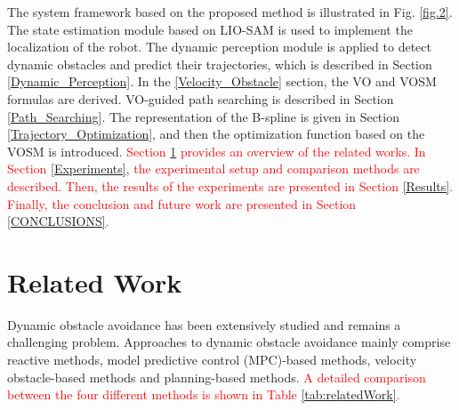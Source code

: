 \documentclass[preprint,5p,times,twocolumn,authoryear]{elsarticle}
\begin{document}
The system framework based on the proposed method is illustrated in Fig. \ref{fig.2}. The state estimation module based on LIO-SAM \citep{shan2020lio} is used to implement the localization of the robot. The dynamic perception module is applied to detect dynamic obstacles and predict their trajectories, which is described in Section \ref{Dynamic_Perception}. In the \ref{Velocity_Obstacle} section, the VO and VOSM formulas are derived. VO-guided path searching is described in Section \ref{Path_Searching}. The representation of the B-spline is given in Section \ref{Trajectory_Optimization}, and then the optimization function based on the VOSM is introduced. \textcolor{red}{Section \ref{related_work} provides an overview of the related works.} \textcolor{red}{In Section \ref{Experiments}, the experimental setup and comparison methods are described. Then, the results of the experiments are presented in Section \ref{Results}. Finally, the conclusion and future work are presented in Section \ref{CONCLUSIONS}.}

\section{Related Work}
\label{related_work}
Dynamic obstacle avoidance has been extensively studied and remains a challenging problem. Approaches to dynamic obstacle avoidance mainly comprise reactive methods, model predictive control (MPC)-based methods, velocity obstacle-based methods and planning-based methods. \textcolor{red}{A detailed comparison between the four different methods is shown in Table \ref{tab:relatedWork}.}
\end{document}
